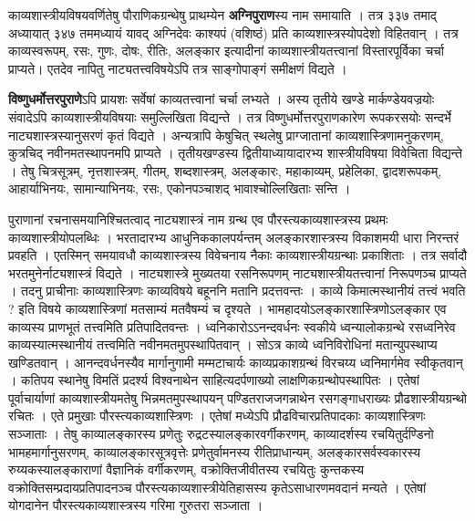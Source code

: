 \documentclass[10pt, a5paper, twoside]{article}
\begin{document}
काव्यशास्त्रीयविषयवर्णितेषु पौराणिकग्रन्थेषु प्राथम्येन \textbf{अग्निपुराण}स्य नाम समायाति । तत्र ३३७ तमाद् अध्यायात् ३४७ तममध्यायं यावद् अग्निदेवः काश्यपं (वशिष्ठं) प्रति काव्यशास्त्रस्योपदेशो विहितवान् । तत्र काव्यस्वरूपम्, रसः, गुणः, दोषः, रीतिः, अलङ्कार इत्यादीनां  काव्यशास्त्रीयतत्त्वानां विस्तारपूर्विका चर्चा प्राप्यते। एतदेव नापितु नाट्यतत्त्वविषयेऽपि तत्र साङ्गोपाङ्गं समीक्षणं विद्यते ।

\textbf{विष्णुधर्मोत्तरपुराणे}ऽपि प्रायशः सर्वेषां काव्यतत्त्वानां चर्चा लभ्यते । अस्य तृतीये खण्डे मार्कण्डेयवज्रयोः संवादेऽपि काव्यशास्त्रीयविषयाः समुल्लिखिता विद्यन्ते । तत्र विष्णुधर्मोत्तरपुराणकारेण रूपकरसयोः सन्दर्भे नाट्यशास्त्रस्यानुसरणं कृतं विद्यते । अन्यत्रापि केषुचित् स्थलेषु प्राग्जातानां काव्यशास्त्रिणामनुकरणम्, कुत्रचिद् नवीनमतस्थापनमपि प्राप्यते । तृतीयखण्डस्य द्वितीयाध्यायादारभ्य शास्त्रीयविषया विवेचिता विद्यन्ते । तेषु चित्रसूत्रम्, नृत्तशास्त्रम्, गीतम्, शब्दशास्त्रम्, अलङ्कारः, महाकाव्यम्, प्रहेलिका, द्वादशरूपकम्, आहार्याभिनयः, सामान्याभिनयः, रसः, एकोनपञ्चाशद् भावाश्चोल्लिखिताः सन्ति ।

पुराणानां रचनासमयानिश्चितत्वाद् नाट्यशास्त्रं नाम ग्रन्थ एव पौरस्त्यकाव्यशास्त्रस्य प्रथमः काव्यशास्त्रीयोपलब्धिः । भरतादारभ्य आधुनिककालपर्यन्तम् अलङ्कारशास्त्रस्य विकाशमयी धारा निरन्तरं प्रवहति । एतस्मिन् समयावधौ काव्यशास्त्रस्य विवेचनाय नैकाः काव्यशास्त्रीयग्रन्थाः प्रकाशिताः । तत्र सर्वादौ भरतमुनेर्नाट्यशास्त्रं विद्यते । नाट्यशास्त्रे मुख्यतया रसनिरूपणम् नाट्यशास्त्रीयतत्त्वानां निरूपणञ्च प्राप्यते । तदनु प्राचीनाः काव्यशास्त्रिणः काव्यविषये बहूननि मतानि प्रदत्तवन्तः । काव्ये किमात्मस्थानीयं तत्त्वं भवति ? इति विषये काव्यशास्त्रिणां मतसाम्यं मतवैषम्यं च दृश्यते । भामहादयोऽलङ्कारशास्त्रिणोऽलङ्कार एव काव्यस्य प्राणभूतं तत्त्वमिति प्रतिपादितवन्तः । ध्वनिकारोऽऽनन्दवर्धनः स्वकीये ध्वन्यालोकग्रन्थे रसध्वनिरेव काव्यस्यात्मस्थानीयं तत्त्वमिति नवीनमतमुपस्थापितवान् । सोऽत्र काव्ये ध्वनिविरोधिनां मतान्युपस्थाप्य खण्डितवान् । आनन्दवर्धनस्यैव मार्गानुगामी मम्मटाचार्यः काव्यप्रकाशग्रन्थं विरचय्य ध्वनिमार्गमेव स्वीकृतवान् । कतिपय स्थानेषु विमतिं प्रदर्श्य विश्वनाथेन साहित्यदर्पणाख्यो लाक्षणिकग्रन्थोपस्थापितः । एतेषां पूर्वाचार्याणां काव्यशास्त्रीयमतेषु भिन्नमतमुपस्थापयन् पण्डितराजजगन्नाथेन रसगङ्गाधराख्यः प्रौढशास्त्रीयग्रन्थो रचितः । एते प्रमुखाः पौरस्त्यकाव्यशास्त्रिणः । एतेषां मध्येऽपि प्रौढविचारप्रतिपादकाः काव्यशास्त्रिणः सञ्जाताः । तेषु काव्यालङ्कारस्य प्रणेतुः रुद्रटस्यालङ्कारवर्गीकरणम्, काव्यादर्शस्य रचयितुर्दण्डिनो भामहमार्गानुसरणम्, काव्यालङ्कारसूत्रवृत्तेः प्रणेतुर्वामनस्य रीतिप्राधान्यम्, अलङ्कारसर्वस्वकारस्य  रुय्यकस्यालङ्काराणां वैज्ञानिकं वर्गीकरणम्, वक्रोक्तिजीवीतस्य रचयितुः कुन्तकस्य वक्रोक्तिसम्प्रदायप्रतिपादनञ्च पौरस्त्यकाव्यशास्त्रीयेतिहासस्य कृतेऽसाधारणमवदानं मन्यते । एतेषां योगदानेन पौरस्त्यकाव्यशास्त्रस्य गरिमा गुरुतरा सञ्जाता ।
\end{document}
